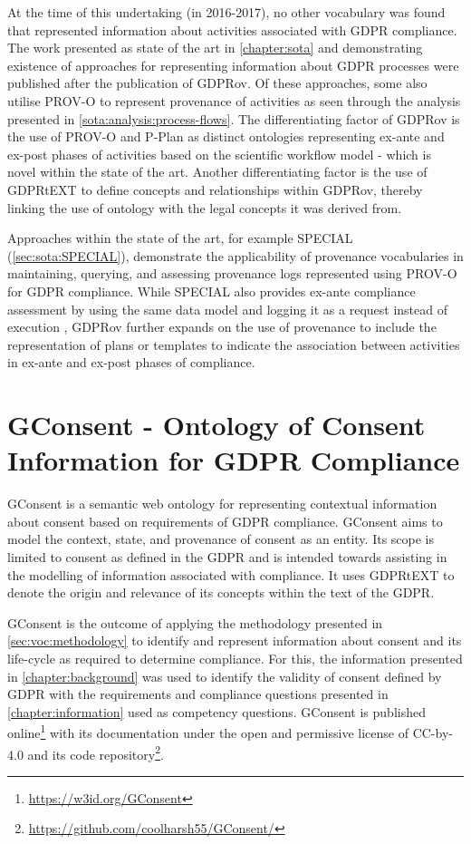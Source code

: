 At the time of this undertaking (in 2016-2017), no other vocabulary was found that represented information about activities associated with GDPR compliance.
The work presented as state of the art in \autoref{chapter:sota} and demonstrating existence of approaches for representing information about GDPR processes were published after the publication of GDPRov. Of these approaches, some also utilise PROV-O to represent provenance of activities as seen through the analysis presented in \autoref{sota:analysis:process-flows}. The differentiating factor of GDPRov is the use of PROV-O and P-Plan as distinct ontologies representing ex-ante and ex-post phases of activities based on the scientific workflow model - which is novel within the state of the art. Another differentiating factor is the use of GDPRtEXT to define concepts and relationships within GDPRov, thereby linking the use of ontology with the legal concepts it was derived from.

Approaches within the state of the art, for example SPECIAL (\autoref{sec:sota:SPECIAL}), demonstrate the applicability of provenance vocabularies in maintaining, querying, and assessing provenance logs represented using PROV-O for GDPR compliance.
While SPECIAL also provides ex-ante compliance assessment by using the same data model and logging it as a request instead of execution \cite{dullaert_d3.4_2019}, GDPRov further expands on the use of provenance to include the representation of plans or templates to indicate the association between activities in ex-ante and ex-post phases of compliance.
\section{GConsent - Ontology of Consent Information for GDPR Compliance}\label{sec:voc:GConsent}
GConsent is a semantic web ontology for representing contextual information about consent based on requirements of GDPR compliance. 
GConsent aims to model the context, state, and provenance of consent as an entity.
Its scope is limited to consent as defined in the GDPR and is intended towards assisting in the modelling of information associated with compliance.
It uses GDPRtEXT to denote the origin and relevance of its concepts within the text of the GDPR.

GConsent is the outcome of applying the methodology presented in \autoref{sec:voc:methodology} to identify and represent information about consent and its life-cycle as required to determine compliance.
For this, the information presented in \autoref{chapter:background} was used to identify the validity of consent defined by GDPR with the requirements and compliance questions presented in \autoref{chapter:information} used as competency questions.
GConsent is published online\footnote{\url{https://w3id.org/GConsent}} with its documentation under the open and permissive license of CC-by-4.0 and its code repository\footnote{\url{https://github.com/coolharsh55/GConsent/}}.

